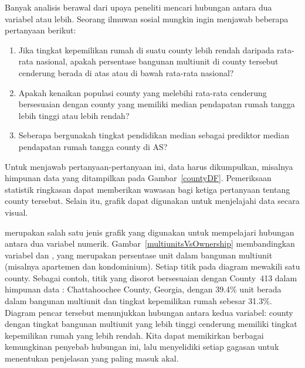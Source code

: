 Banyak analisis berawal dari upaya peneliti mencari
hubungan antara dua variabel atau lebih.
Seorang ilmuwan sosial mungkin ingin menjawab beberapa
pertanyaan berikut:
\newcommand{\popchangevmedianhhincomequestion}[0]{
    Apakah kenaikan populasi county yang melebihi rata-rata
    cenderung bersesuaian dengan county yang memiliki median
    pendapatan rumah tangga lebih tinggi atau lebih rendah?}%
\begin{enumerate}
\setlength{\itemsep}{0mm}
\item[(1)]\label{ownershipMultiUnitQuestion}
    Jika tingkat kepemilikan rumah di suatu county lebih rendah
    daripada rata-rata nasional, apakah persentase bangunan multiunit
    di county tersebut cenderung berada di atas atau di bawah rata-rata nasional?
\item[(2)]\label{pop_change_v_median_hh_income_question}
    \popchangevmedianhhincomequestion{}
\item[(3)]\label{isAverageIncomeAssociatedWithSmokingBans}
    Seberapa bergunakah tingkat pendidikan median sebagai prediktor
    median pendapatan rumah tangga county di AS?
\end{enumerate}

Untuk menjawab pertanyaan-pertanyaan ini, data harus dikumpulkan, misalnya
himpunan data  yang ditampilkan pada Gambar~\ref{countyDF}.
Pemeriksaan statistik ringkasan  dapat
memberikan wawasan bagi ketiga pertanyaan tentang county tersebut.
Selain itu, grafik dapat digunakan untuk menjelajahi data secara visual.

 merupakan salah satu jenis grafik
yang digunakan untuk mempelajari hubungan antara dua variabel numerik.
Gambar~\ref{multiunitsVsOwnership} membandingkan variabel
 dan
,
yang merupakan persentase unit dalam bangunan multiunit
(misalnya apartemen dan kondominium).
Setiap titik pada diagram mewakili satu county.
Sebagai contoh, titik yang disorot bersesuaian dengan
County~413 dalam himpunan data :
Chattahoochee County, Georgia, dengan 39.4\% unit
berada dalam bangunan multiunit dan tingkat kepemilikan rumah
sebesar 31.3\%.
Diagram pencar tersebut menunjukkan hubungan antara kedua
variabel: county dengan tingkat bangunan multiunit yang lebih tinggi
cenderung memiliki tingkat kepemilikan rumah yang lebih rendah.
Kita dapat memikirkan berbagai kemungkinan penyebab hubungan ini,
lalu menyelidiki setiap gagasan untuk menentukan penjelasan yang
paling masuk akal.

